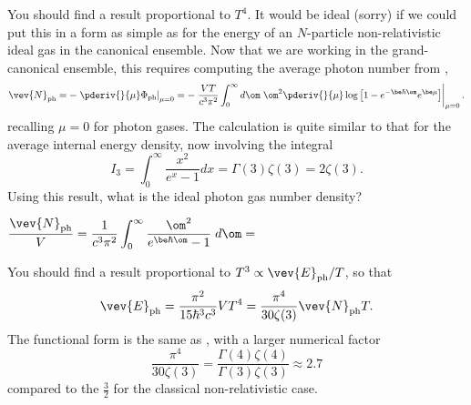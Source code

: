 You should find a result proportional to $T^4$.
It would be ideal (sorry) if we could put this in a form as simple as  for the energy of an $N$-particle non-relativistic ideal gas in the canonical ensemble.
Now that we are working in the grand-canonical ensemble, this requires computing the average photon number from ,
\begin{equation*}
  \vev{N}_{\text{ph}} = -\left. \pderiv{}{\mu} \Phi_{\text{ph}}\right|_{\mu = 0} = -\left. \frac{VT}{c^3 \pi^2} \int_0^{\infty} d\om \; \om^2 \pderiv{}{\mu} \log\left[1 - e^{-\be \hbar \om} e^{\be \mu}\right] \right|_{\mu = 0}.
\end{equation*}
recalling $\mu = 0$ for photon gases.
The calculation is quite similar to that for the average internal energy density, now involving the integral
\begin{equation*}
  I_3 = \int_0^{\infty} \frac{x^2}{e^x - 1} dx = \Gamma(3) \zeta(3) = 2\zeta(3).
\end{equation*}
\newpage %
\noindent Using this result, what is the ideal photon gas number density?
\begin{mdframed}
  $\displaystyle \frac{\vev{N}_{\text{ph}}}{V} = \frac{1}{c^3 \pi^2} \int_0^{\infty} \frac{\om^2}{e^{\be \hbar \om} - 1} \; d\om = $ \\[100 pt]
\end{mdframed}

You should find a result proportional to $T^3 \propto \vev{E}_{\text{ph}} / T$, so that
\begin{equation}
  \vev{E}_{\text{ph}} = \frac{\pi^2}{15 \hbar^3 c^3} VT^4 = \frac{\pi^4}{30\zeta(3)} \vev{N}_{\text{ph}} T.
\end{equation}
The functional form is the same as , with a larger numerical factor
\begin{equation*}
  \frac{\pi^4}{30\zeta(3)} = \frac{\Gamma(4) \zeta(4)}{\Gamma(3) \zeta(3)} \approx 2.7
\end{equation*}
compared to the $\frac{3}{2}$ for the classical non-relativistic case.


